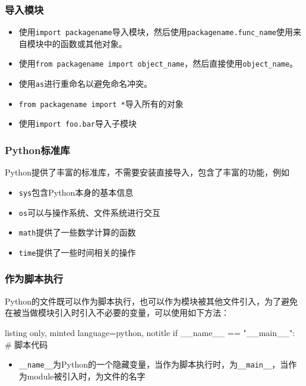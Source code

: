 \documentclass[10pt]{beamer}
\begin{document}
\begin{frame}
    \frametitle{导入模块}
    \begin{itemize}
        \item 使用\texttt{import packagename}导入模块，然后使用\texttt{packagename.func_name}使用来自模块中的函数或其他对象。
        \item 使用\texttt{from packagename import object_name}，然后直接使用\texttt{object_name}。
        \item 使用\texttt{as}进行重命名以避免命名冲突。
        \item \texttt{from packagename import *}导入所有的对象
        \item 使用\texttt{import foo.bar}导入子模块
    \end{itemize}

\end{frame}

\begin{frame}
    \frametitle{Python标准库}

    Python提供了丰富的标准库，不需要安装直接导入，包含了丰富的功能，例如
    \begin{itemize}
        \item \texttt{sys}包含Python本身的基本信息
        \item \texttt{os}可以与操作系统、文件系统进行交互
        \item \texttt{math}提供了一些数学计算的函数
        \item \texttt{time}提供了一些时间相关的操作
    \end{itemize}

\end{frame}

\begin{frame}[fragile]
    \frametitle{作为脚本执行}

    Python的文件既可以作为脚本执行，也可以作为模块被其他文件引入，为了避免在被当做模块引入时引入不必要的变量，可以使用如下方法：

    \begin{tcblisting}{listing only, minted language=python, notitle}
        if __name__ == "__main__":
            # 脚本代码\end{tcblisting}

    \begin{itemize}
        \item \texttt{__name__}为Python的一个隐藏变量，当作为脚本执行时，为\texttt{__main__}，当作为module被引入时，为文件的名字
    \end{itemize}

\end{frame}
\end{document}
